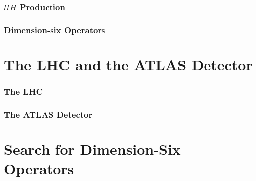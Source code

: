 \documentclass[NOTE, atlasdraft=true, texlive=2016, UKenglish]{\ATLASLATEXPATH atlasdoc}
\begin{document}

\section{$t\bar{t}H$ Production}
\label{sec:tth_theory}



\section{Dimension-six Operators}
\label{sec:smProblems}




\part{The LHC and the ATLAS Detector}
\label{part:lhcAtlas}


\section{The LHC}
\label{sec:lhc}



\section{The ATLAS Detector}
\label{sec:atlas}



\part{Search for Dimension-Six Operators}
\label{part:analysis}
\end{document}
